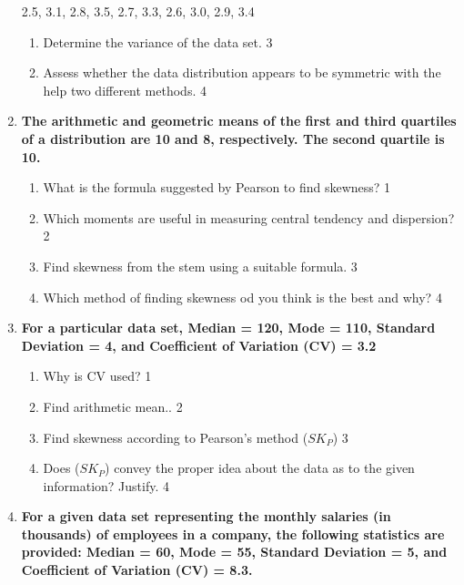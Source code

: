 \documentclass[a4paper,oneside]{book}
\begin{document}
\begin{enumerate}
\begin{center}
2.5, 3.1, 2.8, 3.5, 2.7, 3.3, 2.6, 3.0, 2.9, 3.4
\end{center}

\begin{enumerate}
\item
Determine the variance of the data set. \hfill 3
\item
Assess whether the data distribution appears to be symmetric with the help
two different methods. \hfill 4
\end{enumerate}

  
   \item
	  \textbf{The arithmetic and geometric means of the first and third 
	  quartiles of a distribution are 10 and 8, respectively. The 
	  second quartile is 10.} 
  
  \begin{enumerate}
    \item
	What is the formula suggested by Pearson to find skewness? \hfill 1
    \item
	Which moments are useful in measuring central tendency and dispersion?  \hfill 2
    \item  
	Find skewness from the stem using a suitable formula. \hfill 3
    \item
	Which method of finding skewness od you think is the best and why? \hfill 4
\end{enumerate}

 \item
	  \textbf{For a particular data set, Median = 120, Mode = 110, Standard Deviation = 4, and Coefficient of Variation (CV)  = 3.2} 
  
  \begin{enumerate}
    \item
	Why is  CV used?  \hfill 1
    \item
	Find arithmetic mean.. \hfill 2
    \item  
	Find skewness according to Pearson's method ($SK_P$) \hfill 3
    \item
	Does ($SK_P$) convey the proper idea about the data as to the given information? Justify. \hfill 4
  \end{enumerate}
  
  \item
\textbf{For a given data set representing the monthly salaries (in thousands) of employees in a company, the following statistics are provided: Median = 60, Mode = 55, Standard Deviation = 5, and Coefficient of Variation (CV) = 8.3.}


\end{enumerate}
\end{document}
